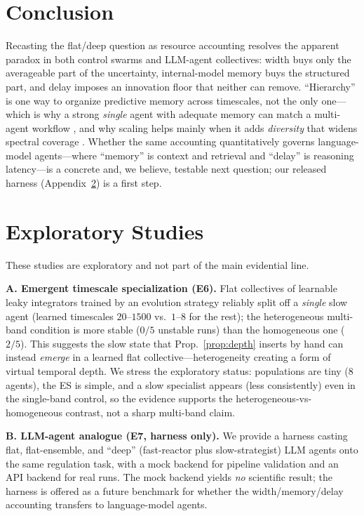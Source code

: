 \documentclass[journal]{IEEEtran}
\begin{document}
\section{Conclusion}
Recasting the flat/deep question as resource accounting resolves the apparent
paradox in both control swarms and LLM-agent collectives: width buys only the
averageable part of the uncertainty, internal-model memory buys the structured
part, and delay imposes an innovation floor that neither can remove.
``Hierarchy'' is one way to organize predictive memory across timescales, not the
only one---which is why a strong \emph{single} agent with adequate memory can
match a multi-agent workflow \cite{xu2026single,tran2026single}, and why scaling
helps mainly when it adds \emph{diversity} that widens spectral coverage
\cite{qian2024scaling}. Whether the same accounting quantitatively governs
language-model agents---where ``memory'' is context and retrieval and ``delay''
is reasoning latency---is a concrete and, we believe, testable next question; our
released harness (Appendix~\ref{app:explore}) is a first step.

\appendices
\section{Exploratory Studies}
\label{app:explore}
These studies are exploratory and not part of the main evidential line.

\textbf{A. Emergent timescale specialization (E6).} Flat collectives of
learnable leaky integrators trained by an evolution strategy \cite{salimans2017es}
reliably split off a \emph{single} slow agent (learned timescales $20\text{--}1500$
vs.\ $1\text{--}8$ for the rest); the heterogeneous multi-band condition is more
stable ($0/5$ unstable runs) than the homogeneous one ($2/5$). This suggests the
slow state that Prop.~\ref{prop:depth} inserts by hand can instead \emph{emerge}
in a learned flat collective---heterogeneity creating a form of virtual temporal
depth. We stress the exploratory status: populations are tiny (8 agents), the ES
is simple, and a slow specialist appears (less consistently) even in the
single-band control, so the evidence supports the heterogeneous-vs-homogeneous
contrast, not a sharp multi-band claim.

\textbf{B. LLM-agent analogue (E7, harness only).} We provide a harness casting
flat, flat-ensemble, and ``deep'' (fast-reactor plus slow-strategist) LLM agents
onto the same regulation task, with a mock backend for pipeline validation and an
API backend for real runs. The mock backend yields \emph{no} scientific result;
the harness is offered as a future benchmark for whether the width/memory/delay
accounting transfers to language-model agents.
\end{document}
